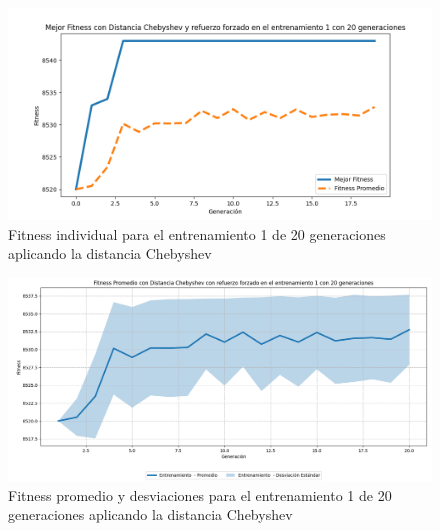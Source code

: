 \documentclass[conference]{IEEEtran}
\begin{document}
\begin{figure}[H]
    \centering
    \includegraphics[width=0.9 \linewidth]{Chebyshev/Fitness_individual_20Gen/Fitness_1_Cheby_20Gen.png}
    \caption{Fitness individual para el entrenamiento 1 de 20 generaciones aplicando la distancia Chebyshev}
    \label{fig:cheb_1_20}
\end{figure}
\begin{figure}[H]
    \centering
    \includegraphics[width=0.9 \linewidth]{Chebyshev/Fitness_individual_20Gen/Fitness_1_Cheby_20Gen_Sombra.png}
    \caption{Fitness promedio y desviaciones para el entrenamiento 1 de 20 generaciones aplicando la distancia Chebyshev}
    \label{fig:cheb_1_20_sombra}
\end{figure}
\end{document}
